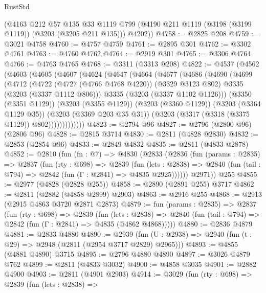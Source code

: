 \begin{lexlean}{RustStd}
\begin{coremodule}
{\begin{coremodule}
{{{{{{{{{{{{{{{      (@4163
        @212
        @57
        @135
        @33
        @1119
        @799
        (@4190 @211 @1119 (@3198 (@3199 @1119)) (@3203 (@3205 @211 @135)))
        @4202))
@4758 := @2825 @208
@4759 := @3021 @4758
@4760 := @4757 @4759
@4761 := @2895 @301
@4762 := @3302 @4761
@4763 := @4760 @4762
@4764 := @2919 @301
@4765 := @3306 @4764
@4766 := @4763 @4765
@4768 := @3311 (@3313 @208)
@4822 := @4537
    (@4562
      (@4603
        (@4605
          (@4607
            (@4624
              (@4647
                (@4664
                  (@4677
                    (@4686
                      (@4690
                        (@4699
                          (@4712
                            (@4722
                              (@4727 (@4766 @4768 @4220))
                              (@3329 @3123 @802)
                              @3335
                              (@3203 (@3337 @1112 @806)))
                            @3335
                            (@3203 (@3337 @1102 @1126)))
                          (@3350 (@3351 @1129))
                          (@3203 (@3355 @1129))
                          (@3203 (@3360 @1129))
                          (@3203 (@3364 @1129 @35))
                          (@3203 (@3369 @203 @35 @31))
                          (@3203 (@3317 (@3318 (@3375 @1129)) @802)))))))))))))
@4823 := @2794 @96
@4827 := @2796 (@2800 @96) (@2806 @96)
@4828 := @2815 @3714
@4830 := @2811 (@4828 @2830)
@4832 := @2853 (@2854 @96)
@4833 := @2849 @4832
@4835 := @2811 (@4833 @2878)
@4852 := @2810
    (fun (fn : @7) =>
    @4830
      (@2833
        (@2836
          (fun (params : @2835) =>
          @2837
            (fun (rty : @698) =>
            @2839
              (fun (lets : @2838) =>
              @2840 (fun (tail : @794) => @2842 (fun (Γ : @2841) => @4835 @2925))))))
        @2971))
    @255
@4855 := @2977 (@4828 (@2828 @255))
@4858 := @2890 (@2891 @255) @3717
@4862 := @2811 (@2882 (@4858 @2899) @2903)
@4863 := @2916 @255
@4868 := @2913 (@2915 @4863 @3720 @2871 @2873)
@4879 := fun (params : @2835) =>
  @2837
    (fun (rty : @698) =>
    @2839
      (fun (lets : @2838) =>
      @2840 (fun (tail : @794) => @2842 (fun (Γ : @2841) => @4835 (@4862 @4868)))))
@4880 := @2836 @4879
@4881 := @2833 @4880
@4890 := @2939 (fun (U : @2938) => @2940 (fun (t : @29) => @2948 (@2811 (@2954 @3717 @2829) @2965)))
@4893 := @4855 (@4881 @4890) @3715
@4895 := @2796 @4880 @4890
@4897 := @3026 @4879 @762
@4899 := @2811 (@4833 @3032)
@4900 := @4858 @3035
@4901 := @2882 @4900
@4903 := @2811 (@4901 @2903)
@4914 := @3029
    (fun (rty : @698) =>
    @2839
      (fun (lets : @2838) =>
}}}}}}}}}}}}}}}
\end{coremodule}}
\end{coremodule}
\end{lexlean}
